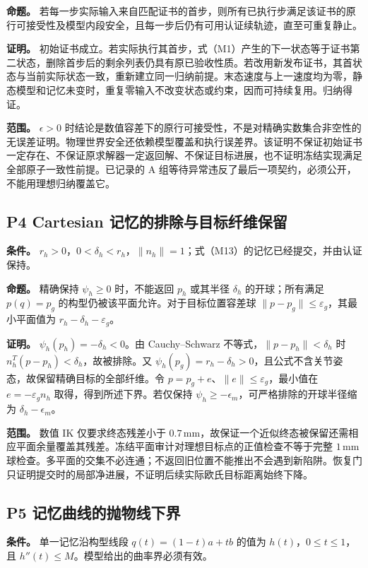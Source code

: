 \textbf{命题。} 若每一步实际输入来自匹配证书的首步，则所有已执行步满足该证书的原行可接受性及模型内段安全，且每一步后仍有可用认证续轨迹，直至可重复静止。

\textbf{证明。} 初始证书成立。若实际执行其首步，式（M1）产生的下一状态等于证书第二状态，删除首步后的剩余列表仍具有原已验收性质。若改用新发布证书，其首状态与当前实际状态一致，重新建立同一归纳前提。末态速度与上一速度均为零，静态模型和记忆未变时，重复零输入不改变状态或约束，因而可持续复用。归纳得证。

\textbf{范围。} $\epsilon>0$ 时结论是数值容差下的原行可接受性，不是对精确实数集合非空性的无误差证明。物理世界安全还依赖模型覆盖和执行误差界。该证明不保证初始证书一定存在、不保证原求解器一定返回解、不保证目标进展，也不证明冻结实现满足全部原子一致性前提。已记录的 A 组等待异常违反了最后一项契约，必须公开，不能用理想归纳覆盖它。

\subsection{P4 Cartesian 记忆的排除与目标纤维保留}
\textbf{条件。} $r_h>0$，$0<\delta_h<r_h$，$\|n_h\|=1$；式（M13）的记忆已经提交，并由认证保持。

\textbf{命题。} 精确保持 $\psi_h\ge0$ 时，不能返回 $p_h$ 或其半径 $\delta_h$ 的开球；所有满足 $p(q)=p_g$ 的构型仍被该平面允许。对于目标位置容差球 $\|p-p_g\|\le\varepsilon_g$，其最小平面值为 $r_h-\delta_h-\varepsilon_g$。

\textbf{证明。} $\psi_h(p_h)=-\delta_h<0$。由 Cauchy--Schwarz 不等式，$\|p-p_h\|<\delta_h$ 时 $n_h^T(p-p_h)<\delta_h$，故被排除。又 $\psi_h(p_g)=r_h-\delta_h>0$，且公式不含关节姿态，故保留精确目标的全部纤维。令 $p=p_g+e$、$\|e\|\le\varepsilon_g$，最小值在 $e=-\varepsilon_g n_h$ 取得，得到所述下界。若仅保持 $\psi_h\ge-\epsilon_m$，可严格排除的开球半径缩为 $\delta_h-\epsilon_m$。

\textbf{范围。} 数值 IK 仅要求终态残差小于 $0.7\,\mathrm{mm}$，故保证一个近似终态被保留还需相应平面余量覆盖其残差。冻结平面审计对理想目标点的正值检查不等于完整 $1\,\mathrm{mm}$ 球检查。多平面的交集不必连通；不返回旧位置不能推出不会遇到新陷阱。恢复门只证明提交时的局部净进展，不证明后续实际欧氏目标距离始终下降。

\subsection{P5 记忆曲线的抛物线下界}
\textbf{条件。} 单一记忆沿构型线段 $q(t)=(1-t)a+tb$ 的值为 $h(t)$，$0\le t\le1$，且 $h''(t)\le M$。模型给出的曲率界必须有效。

